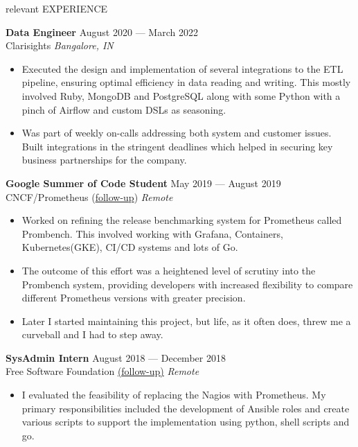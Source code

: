 \documentclass{resume} %
\begin{document}
\begin{rSection}{relevant EXPERIENCE}

  \textbf{Data Engineer} \hfill August 2020 — March 2022\\
  Clarisights \hfill \textit{Bangalore, IN}
  \begin{itemize}
    \itemsep -3pt {}
    \item Executed the design and implementation of several integrations to the ETL pipeline, ensuring optimal efficiency in data reading and writing. This mostly involved Ruby, MongoDB and PostgreSQL along with some Python with a pinch of Airflow and custom DSLs as seasoning.
    \item Was part of weekly on-calls addressing both system and customer issues. Built integrations in the stringent deadlines which helped in securing key business partnerships for the company.
  \end{itemize}

  \textbf{Google Summer of Code Student} \hfill May 2019 — August 2019\\
  CNCF/Prometheus (\href{https://blog.geekodour.org/posts/gsoc19/}{follow-up}) \hfill \textit{Remote}
  \begin{itemize}
    \itemsep -3pt {}
    \item Worked on refining the release benchmarking system for Prometheus called Prombench. This involved working with Grafana, Containers, Kubernetes(GKE), CI/CD systems and lots of Go.
    \item The outcome of this effort was a heightened level of scrutiny into the Prombench system, providing developers with increased flexibility to compare different Prometheus versions with greater precision.
    \item Later I started maintaining this project, but life, as it often does, threw me a curveball and I had to step away.
  \end{itemize}

  \textbf{SysAdmin Intern} \hfill August 2018 — December 2018\\
  Free Software Foundation \href{https://www.fsf.org/blogs/sysadmin/what-i-learned-during-my-internship-with-the-fsf-tech-team}{(follow-up)} \hfill \textit{Remote}
  \begin{itemize}
    \itemsep -3pt {}
    \item I evaluated the feasibility of replacing the Nagios with Prometheus. My primary responsibilities included the development of Ansible roles and create various scripts to support the implementation using python, shell scripts and go.
  \end{itemize}


\end{rSection}
\end{document}
